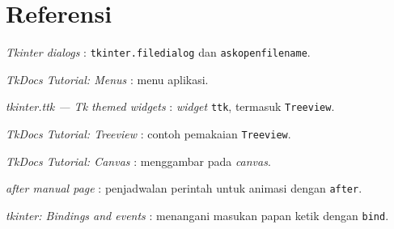 \section*{Referensi}
\begin{daftarrapat}
  \item \textit{Tkinter dialogs} \cite{py-dialog}: \texttt{tkinter.filedialog} dan \texttt{askopenfilename}.
  \item \textit{TkDocs Tutorial: Menus} \cite{tkdocs-menus}: menu aplikasi.
  \item \textit{tkinter.ttk — Tk themed widgets} \cite{py-ttk}: \textit{widget} \texttt{ttk}, termasuk \texttt{Treeview}.
  \item \textit{TkDocs Tutorial: Treeview} \cite{tkdocs-tree}: contoh pemakaian \texttt{Treeview}.
  \item \textit{TkDocs Tutorial: Canvas} \cite{tkdocs-canvas}: menggambar pada \textit{canvas}.
  \item \textit{after manual page} \cite{tcl-after}: penjadwalan perintah untuk animasi dengan \texttt{after}.
  \item \textit{tkinter: Bindings and events} \cite{py-tkinter-bindings}: menangani masukan papan ketik dengan \texttt{bind}.
\end{daftarrapat}
